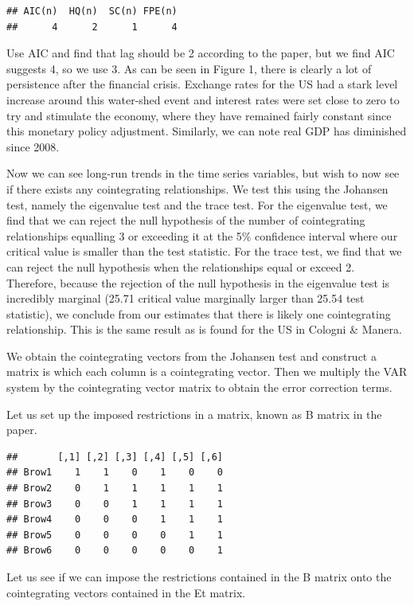 \documentclass[11pt,preprint, authoryear]{elsarticle}
\numberwithin{equation}{section}
\numberwithin{figure}{section}
\numberwithin{table}{section}
\begin{document}
\begin{verbatim}
## AIC(n)  HQ(n)  SC(n) FPE(n) 
##      4      2      1      4
\end{verbatim}

Use AIC and find that lag should be 2 according to the paper, but we
find AIC suggests 4, so we use 3. As can be seen in Figure 1, there is
clearly a lot of persistence after the financial crisis. Exchange rates
for the US had a stark level increase around this water-shed event and
interest rates were set close to zero to try and stimulate the economy,
where they have remained fairly constant since this monetary policy
adjustment. Similarly, we can note real GDP has diminished since 2008.

Now we can see long-run trends in the time series variables, but wish to
now see if there exists any cointegrating relationships. We test this
using the Johansen test, namely the eigenvalue test and the trace test.
For the eigenvalue test, we find that we can reject the null hypothesis
of the number of cointegrating relationships equalling 3 or exceeding it
at the 5\% confidence interval where our critical value is smaller than
the test statistic. For the trace test, we find that we can reject the
null hypothesis when the relationships equal or exceed 2. Therefore,
because the rejection of the null hypothesis in the eigenvalue test is
incredibly marginal (25.71 critical value marginally larger than 25.54
test statistic), we conclude from our estimates that there is likely one
cointegrating relationship. This is the same result as is found for the
US in Cologni \& Manera.

We obtain the cointegrating vectors from the Johansen test and construct
a matrix is which each column is a cointegrating vector. Then we
multiply the VAR system by the cointegrating vector matrix to obtain the
error correction terms.

Let us set up the imposed restrictions in a matrix, known as B matrix in
the paper.

\begin{verbatim}
##       [,1] [,2] [,3] [,4] [,5] [,6]
## Brow1    1    1    0    1    0    0
## Brow2    0    1    1    1    1    1
## Brow3    0    0    1    1    1    1
## Brow4    0    0    0    1    1    1
## Brow5    0    0    0    0    1    1
## Brow6    0    0    0    0    0    1
\end{verbatim}

Let us see if we can impose the restrictions contained in the B matrix
onto the cointegrating vectors contained in the Et matrix.
\end{document}
